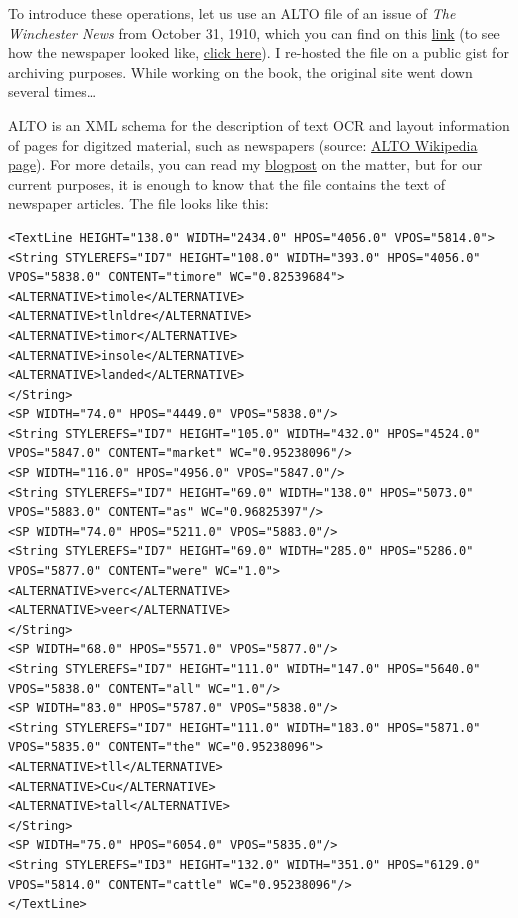 \documentclass[]{gitbook}
\begin{document}
To introduce these operations, let us use an ALTO file of an issue of \emph{The Winchester News} from
October 31, 1910, which you can find on this
\href{https://gist.githubusercontent.com/b-rodrigues/5139560e7d0f2ecebe5da1df3629e015/raw/e3031d894ffb97217ddbad1ade1b307c9937d2c8/gistfile1.txt}{link} (to see
how the newspaper looked like,
\href{https://chroniclingamerica.loc.gov/lccn/sn86069133/1910-10-31/ed-1/seq-1/}{click here}). I re-hosted
the file on a public gist for archiving purposes. While working on the book, the original site went
down several times\ldots{}

ALTO is an XML schema for the description of text OCR and layout information of pages for digitzed
material, such as newspapers (source: \href{https://en.wikipedia.org/wiki/ALTO_(XML)}{ALTO Wikipedia page}).
For more details, you can read my
\href{https://www.brodrigues.co/blog/2019-01-13-newspapers_mets_alto/}{blogpost}
on the matter, but for our current purposes, it is enough to know that the file contains the text
of newspaper articles. The file looks like this:

\begin{verbatim}
<TextLine HEIGHT="138.0" WIDTH="2434.0" HPOS="4056.0" VPOS="5814.0">
<String STYLEREFS="ID7" HEIGHT="108.0" WIDTH="393.0" HPOS="4056.0" VPOS="5838.0" CONTENT="timore" WC="0.82539684">
<ALTERNATIVE>timole</ALTERNATIVE>
<ALTERNATIVE>tlnldre</ALTERNATIVE>
<ALTERNATIVE>timor</ALTERNATIVE>
<ALTERNATIVE>insole</ALTERNATIVE>
<ALTERNATIVE>landed</ALTERNATIVE>
</String>
<SP WIDTH="74.0" HPOS="4449.0" VPOS="5838.0"/>
<String STYLEREFS="ID7" HEIGHT="105.0" WIDTH="432.0" HPOS="4524.0" VPOS="5847.0" CONTENT="market" WC="0.95238096"/>
<SP WIDTH="116.0" HPOS="4956.0" VPOS="5847.0"/>
<String STYLEREFS="ID7" HEIGHT="69.0" WIDTH="138.0" HPOS="5073.0" VPOS="5883.0" CONTENT="as" WC="0.96825397"/>
<SP WIDTH="74.0" HPOS="5211.0" VPOS="5883.0"/>
<String STYLEREFS="ID7" HEIGHT="69.0" WIDTH="285.0" HPOS="5286.0" VPOS="5877.0" CONTENT="were" WC="1.0">
<ALTERNATIVE>verc</ALTERNATIVE>
<ALTERNATIVE>veer</ALTERNATIVE>
</String>
<SP WIDTH="68.0" HPOS="5571.0" VPOS="5877.0"/>
<String STYLEREFS="ID7" HEIGHT="111.0" WIDTH="147.0" HPOS="5640.0" VPOS="5838.0" CONTENT="all" WC="1.0"/>
<SP WIDTH="83.0" HPOS="5787.0" VPOS="5838.0"/>
<String STYLEREFS="ID7" HEIGHT="111.0" WIDTH="183.0" HPOS="5871.0" VPOS="5835.0" CONTENT="the" WC="0.95238096">
<ALTERNATIVE>tll</ALTERNATIVE>
<ALTERNATIVE>Cu</ALTERNATIVE>
<ALTERNATIVE>tall</ALTERNATIVE>
</String>
<SP WIDTH="75.0" HPOS="6054.0" VPOS="5835.0"/>
<String STYLEREFS="ID3" HEIGHT="132.0" WIDTH="351.0" HPOS="6129.0" VPOS="5814.0" CONTENT="cattle" WC="0.95238096"/>
</TextLine>
\end{verbatim}
\end{document}
